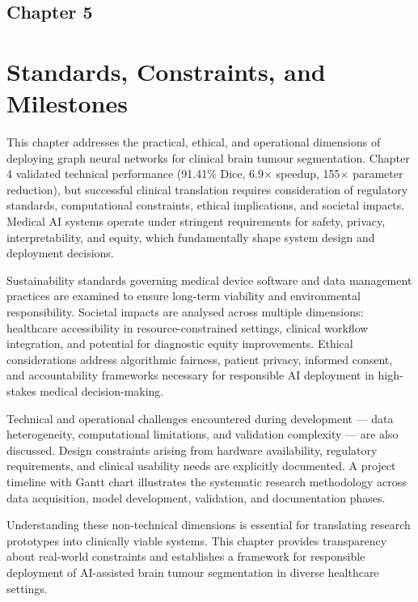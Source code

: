 \begin{center}
    \section*{\fontsize{20}{20}\selectfont Chapter 5}
\end{center}
\vspace{10mm}

\section{Standards, Constraints, and Milestones}

This chapter addresses the practical, ethical, and operational dimensions of deploying graph neural networks for clinical brain tumour segmentation. Chapter 4 validated technical performance (91.41\% Dice, 6.9$\times$ speedup, 155$\times$ parameter reduction), but successful clinical translation requires consideration of regulatory standards, computational constraints, ethical implications, and societal impacts. Medical AI systems operate under stringent requirements for safety, privacy, interpretability, and equity, which fundamentally shape system design and deployment decisions.

Sustainability standards governing medical device software and data management practices are examined to ensure long-term viability and environmental responsibility. Societal impacts are analysed across multiple dimensions: healthcare accessibility in resource-constrained settings, clinical workflow integration, and potential for diagnostic equity improvements. Ethical considerations address algorithmic fairness, patient privacy, informed consent, and accountability frameworks necessary for responsible AI deployment in high-stakes medical decision-making.

Technical and operational challenges encountered during development — data heterogeneity, computational limitations, and validation complexity — are also discussed. Design constraints arising from hardware availability, regulatory requirements, and clinical usability needs are explicitly documented. A project timeline with Gantt chart illustrates the systematic research methodology across data acquisition, model development, validation, and documentation phases.

Understanding these non-technical dimensions is essential for translating research prototypes into clinically viable systems. This chapter provides transparency about real-world constraints and establishes a framework for responsible deployment of AI-assisted brain tumour segmentation in diverse healthcare settings.


